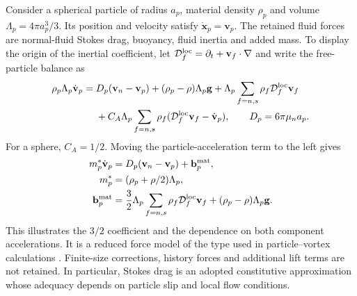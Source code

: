 \documentclass[11pt]{article}
\numberwithin{equation}{section}
\begin{document}
Consider a spherical particle of radius $a_p$, material density $\rho_p$ and volume $\Lambda_p=4\pi a_p^3/3$. Its position and velocity satisfy $\dot{\mathbf x}_p=\mathbf v_p$. The retained fluid forces are normal-fluid Stokes drag, buoyancy, fluid inertia and added mass. To display the origin of the inertial coefficient, let $\mathcal D_f^{\rm loc}=\partial_t+\mathbf v_f\cdot\nabla$ and write the free-particle balance as
\begin{equation}
 \begin{aligned}
 \rho_p\Lambda_p\dot{\mathbf v}_p={}&
 D_p(\mathbf v_n-\mathbf v_p)+(\rho_p-\rho)\Lambda_p\mathbf g
 +\Lambda_p\sum_{f=n,s}\rho_f\mathcal D_f^{\rm loc}\mathbf v_f\\
 &+C_A\Lambda_p\sum_{f=n,s}\rho_f
      (\mathcal D_f^{\rm loc}\mathbf v_f-\dot{\mathbf v}_p),
 \qquad D_p=6\pi\mu_n a_p.
 \end{aligned}
 \label{eq:addedmassderivation}
\end{equation}
For a sphere, $C_A=1/2$. Moving the particle-acceleration term to the left gives
\begin{equation}
 \begin{aligned}
 m_p^*\dot{\mathbf v}_p
 &=D_p(\mathbf v_n-\mathbf v_p)+\mathbf b_p^{\rm mat},\\
 m_p^*&=(\rho_p+\rho/2)\Lambda_p,\\
 \mathbf b_p^{\rm mat}
 &=\frac32\Lambda_p\sum_{f=n,s}\rho_f\mathcal D_f^{\rm loc}\mathbf v_f
   +(\rho_p-\rho)\Lambda_p\mathbf g.
 \end{aligned}
 \label{eq:freephysical}
\end{equation}
This illustrates the $3/2$ coefficient and the dependence on both component accelerations. It is a reduced force model of the type used in particle--vortex calculations \citep{Mineda2013}. Finite-size corrections, history forces and additional lift terms are not retained. In particular, Stokes drag is an adopted constitutive approximation whose adequacy depends on particle slip and local flow conditions.
\end{document}
